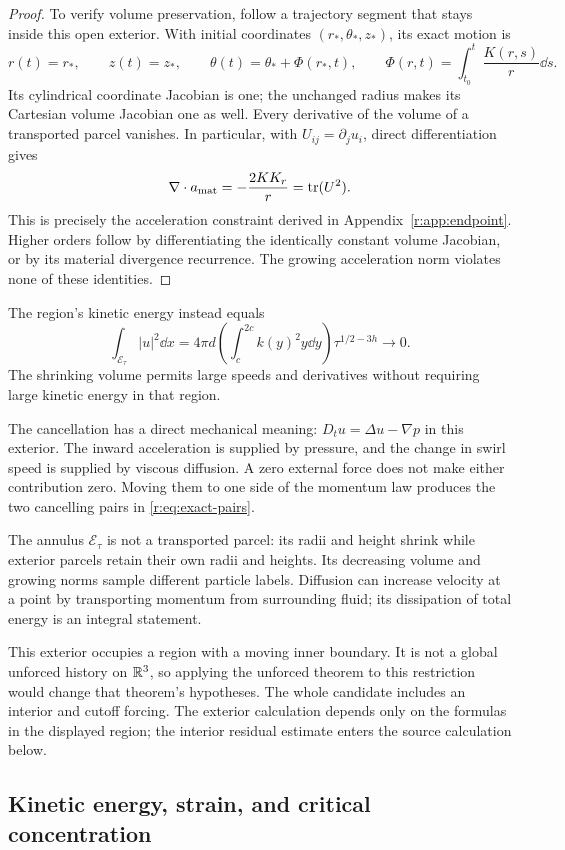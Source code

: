 \begin{proof}
To verify volume preservation, follow a trajectory segment that stays
inside this open exterior. With initial coordinates
\((r_*,\theta_*,z_*)\), its exact motion is
\[
 r(t)=r_*,\qquad z(t)=z_*,\qquad
 \theta(t)=\theta_*+\Phi(r_*,t),\qquad
 \Phi(r,t)=\int_{t_0}^t\frac{K(r,s)}r\dd s .
\]
Its cylindrical coordinate Jacobian is one; the unchanged radius makes
its Cartesian volume Jacobian one as well. Every derivative of the volume
of a transported parcel vanishes. In particular, with
\(U_{ij}=\partial_j u_i\), direct differentiation gives
\[
 \nabla\cdot a_{\rm mat}
 =-\frac{2KK_r}{r}
 =\operatorname{tr}(U^2).
\]
This is precisely the acceleration constraint derived in
Appendix~\ref{r:app:endpoint}. Higher orders follow by differentiating the
identically constant volume Jacobian, or by its material divergence
recurrence. The growing acceleration norm violates none of these
identities.
\end{proof}

The region's kinetic energy instead equals
\[
 \int_{\mathcal E_\tau}|u|^2\dd x
 =4\pi d\left(\int_c^{2c}k(y)^2y\dd y\right)
 \tau^{1/2-3h}\longrightarrow0.
\]
The shrinking volume permits large speeds and derivatives without
requiring large kinetic energy in that region.

The cancellation has a direct mechanical meaning:
\(D_tu=\Delta u-\nabla p\) in this exterior.
The inward acceleration is supplied by pressure, and the change in swirl
speed is supplied by viscous diffusion. A zero external force does not
make either contribution zero. Moving them to one side of the momentum
law produces the two cancelling pairs in \eqref{r:eq:exact-pairs}.

The annulus \(\mathcal E_\tau\) is not a transported parcel: its radii and
height shrink while exterior parcels retain their own radii and heights.
Its decreasing volume and growing norms sample different particle labels.
Diffusion can increase
velocity at a point by transporting momentum from surrounding fluid;
its dissipation of total energy is an integral statement.

This exterior occupies a region with a moving inner boundary. It is not
a global unforced history on \(\mathbb R^3\), so applying the unforced
theorem to this restriction would change that theorem's hypotheses.
The whole candidate includes an interior and cutoff forcing. The
exterior calculation depends only on the formulas in the displayed
region; the interior residual estimate enters the source calculation
below.

\subsection{Kinetic energy, strain, and critical concentration}

